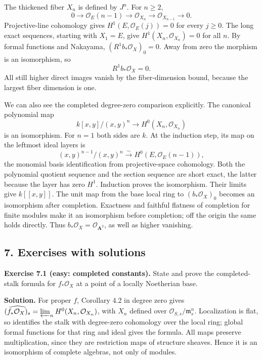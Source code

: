 \documentclass[11pt]{article}
\begin{document}
The thickened fiber \(X_n\) is defined by \(J^n\). For \(n\geq2\), \[
0\to\mathcal O_E(n-1)\to\mathcal O_{X_n}\to\mathcal O_{X_{n-1}}\to0.
\] Projective-line cohomology gives \(H^1(E,\mathcal O_E(j))=0\) for
every \(j\geq0\). The long exact sequences, starting with \(X_1=E\),
give \(H^1(X_n,\mathcal O_{X_n})=0\) for all \(n\). By formal functions
and Nakayama, \((R^1b_*\mathcal O_X)_0=0\). Away from zero the morphism
is an isomorphism, so \[
R^1b_*\mathcal O_X=0.
\] All still higher direct images vanish by the fiber-dimension bound,
because the largest fiber dimension is one.

We can also see the completed degree-zero comparison explicitly. The
canonical polynomial map \[
k[x,y]/(x,y)^n\longrightarrow H^0(X_n,\mathcal O_{X_n})
\] is an isomorphism. For \(n=1\) both sides are \(k\). At the induction
step, its map on the leftmost ideal layers is \[
(x,y)^{n-1}/(x,y)^n\xrightarrow{\sim}H^0(E,\mathcal O_E(n-1)),
\] the monomial basis identification from projective-space cohomology.
Both the polynomial quotient sequence and the section sequence are short
exact, the latter because the layer has zero \(H^1\). Induction proves
the isomorphism. Their limits give \(k[[x,y]]\). The unit map from the
base local ring to \((b_*\mathcal O_X)_0\) becomes an isomorphism after
completion. Exactness and faithful flatness of completion for finite
modules make it an isomorphism before completion; off the origin the
same holds directly. Thus \(b_*\mathcal O_X=\mathcal O_{\mathbf A^2}\),
as well as higher vanishing.

\subsection{7. Exercises with solutions}\label{exercises-with-solutions}

\textbf{Exercise 7.1 (easy: completed constants).} State and prove the
completed-stalk formula for \(f_*\mathcal O_X\) at a point of a locally
Noetherian base.

\textbf{Solution.} For proper \(f\), Corollary 4.2 in degree zero gives
\(\widehat{(f_*\mathcal O_X)_s}=\varprojlim_n H^0(X_n,\mathcal O_{X_n})\),
with \(X_n\) defined over \(\mathcal O_{S,s}/\mathfrak m_s^n\).
Localization is flat, so identifies the stalk with degree-zero
cohomology over the local ring; global formal functions for that ring
and ideal gives the formula. All maps preserve multiplication, since
they are restriction maps of structure sheaves. Hence it is an
isomorphism of complete algebras, not only of modules.
\end{document}
